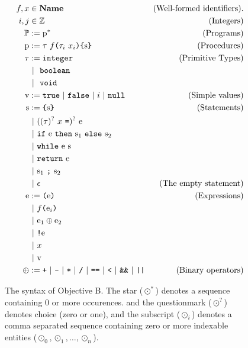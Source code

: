 \documentclass[fleqn,10pt]{olplainarticle}
\def\lang{Objective B}
\begin{document}
\begin{figure}[ht!]
\begin{center}
\begin{align*}
  f, x &\in \text{\bf Name}   &\text{(Well-formed identifiers).}\\
  i, j &\in \mathbb{Z}                                      &\text{(Integers)}\\
\mathbb{P} &:= \text{p}^*                                           &\text{(Programs)}\\
\text{p} &:= \tau~f\text{\tt (}\tau_i~ x_i\text{\tt )} \text{\tt \{}\text{s}\text{\tt \}} &\text{(Procedures)}\\
\tau &:= \text{\tt integer}                                     &\text{(Primitive Types)}\\
      &\ |\  ~ \text{\tt boolean}\\
      &\ |\  ~ \text{\tt void}\\
\text{v}  &:=  \text{\tt true} \ |\  \text{\tt false} \ |\  i \ |\  \text{\tt null} &\text{(Simple values)}\\
\text{s} &:=  \text{\tt \{} \text{s} \text{\tt \}}                         &\text{(Statements)}\\
      &\ |\  ((\tau)^?~x~\text{\tt =})^?~\text{e}\\
      &\ |\  \text{\tt if}~{\text{e}}~\text{\tt then}~{\text{s}_1}~\text{\tt else}~\text{s}_2\\
      &\ |\  \text{\tt while}~\text{e}~\text{s}\\
      &\ |\  \text{\tt return}~\text{e}\\
      &\ |\  \text{s}_1~\text{\tt ;}~\text{s}_2\\
      &\ |\  \epsilon                                        &\text{(The empty statement)}\\
\text{e}  &:= \text{\tt (} \text{e} \text{\tt )}                             &\text{(Expressions)}\\
      &\ |\  f\text{\tt (}\text{e}_i\text{\tt )}\\
      &\ |\  \text{e}_1 \oplus \text{e}_2\\
      &\ |\  \text{\tt !} \text{e}\\
      &\ |\  x\\
      &\ |\  \text{v}\\
\oplus   &:= \text{\tt +}
       \ |\  \text{\tt -}
       \ |\  \text{\tt *}
       \ |\  \text{\tt /}
       \ |\  \text{\tt ==}
       \ |\  \text{\tt <}
       \ |\  \text{\tt \&\&}
       \ |\  \text{\tt ||}                                        &\text{(Binary operators)}
\end{align*}
\end{center}
\vspace{-4mm}
\caption{The syntax of \lang. The star ($\odot^*$) denotes a sequence
  containing $0$ or more occurences. and the questionmark ($\odot^?$)
  denotes choice (zero or one), and the subscript ($\odot_i$) denotes a
  comma separated sequence containing zero or more indexable entities
  ($\odot_0, \odot_1, \dots, \odot_n$).}
\label{fig:syntax}
\end{figure}
\end{document}
